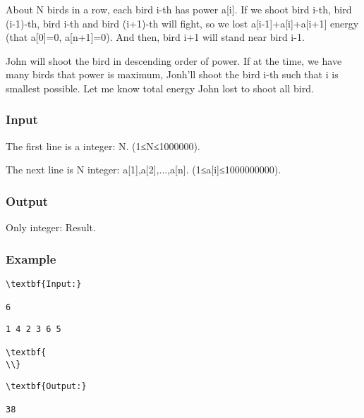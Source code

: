 

About N birds in a row, each bird i-th has power a[i]. If we shoot bird i-th, bird (i-1)-th, bird i-th and bird (i+1)-th will fight, so we lost a[i-1]+a[i]+a[i+1] energy (that a[0]=0, a[n+1]=0). And then, bird i+1 will stand near bird i-1.

John will shoot the bird in descending order of power. If at the time, we have many birds that power is maximum, Jonh'll shoot the bird i-th such that i is smallest possible. Let me know total energy John lost to shoot all bird.

\subsubsection{Input}

The first line is a integer: N. (1≤N≤1000000).

The next line is N integer: a[1],a[2],...,a[n]. (1≤a[i]≤1000000000).

\subsubsection{Output}

Only integer: Result.

\subsubsection{Example}
\begin{verbatim}
\textbf{Input:}

6\end{verbatim}
\begin{verbatim}
1 4 2 3 6 5

\textbf{
\\}\end{verbatim}
\begin{verbatim}
\textbf{Output:}

38\end{verbatim}